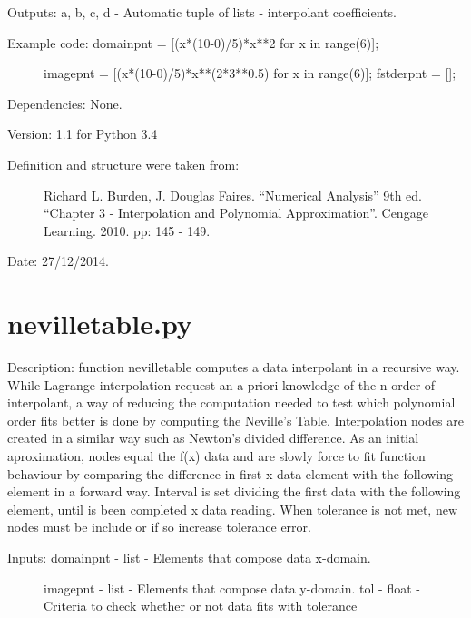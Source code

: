 \documentclass[letterpaper,10pt,oneside]{sphinxmanual}
\theoremstyle{plain}%
\theoremstyle{definition}%
\theoremstyle{remark}%
\begin{document}
Outputs: a, b, c, d - Automatic tuple of lists - interpolant coefficients.
\begin{description}
\item[{Example code: domainpnt = {[}(x*(10-0)/5)*x**2 for x in range(6){]};}] \leavevmode
imagepnt = {[}(x*(10-0)/5)*x**(2*3**0.5) for x in range(6){]};
fstderpnt = {[}{]};

\end{description}

Dependencies: None.

Version: 1.1 for Python 3.4
\begin{description}
\item[{Definition and structure were taken from:}] \leavevmode
Richard L. Burden, J. Douglas Faires. ``Numerical Analysis'' 9th ed.
``Chapter 3 - Interpolation and Polynomial Approximation''. 
Cengage Learning. 2010. pp: 145 - 149.

\end{description}




Date: 27/12/2014.


\section{nevilletable.py}
\label{code:nevilletable-py}\label{code:module-nevilletable}
Description: function nevilletable computes a data interpolant in a recursive
way.  While Lagrange interpolation request an a priori knowledge of the n
order of interpolant, a way of reducing the computation needed to test
which polynomial order fits better is done by computing the Neville's Table.
Interpolation nodes are created in a similar way such as Newton's divided
difference. As an initial aproximation, nodes equal the f(x) data and are
slowly force to fit function behaviour by comparing the difference in first 
x data element with the following element in a forward way. Interval is set
dividing the first data with the following element, until is been completed
x data reading. When tolerance is not met, new nodes must be include or if 
so increase tolerance error.
\begin{description}
\item[{Inputs: domainpnt - list - Elements that compose data x-domain. }] \leavevmode
imagepnt - list - Elements that compose data y-domain.
tol - float - Criteria to check whether or not data fits with tolerance

\end{description}
\end{document}
